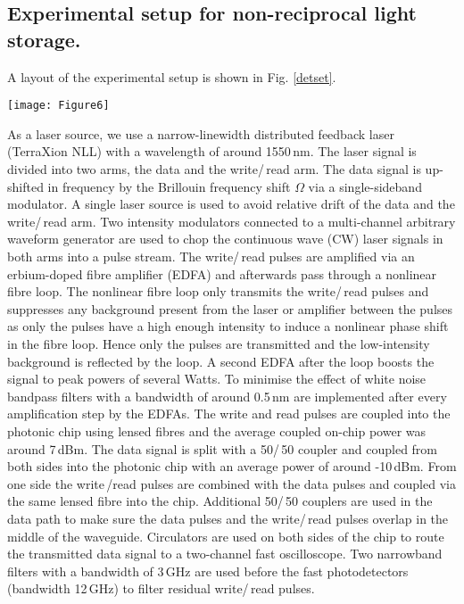 \documentclass[superscriptaddress, nofootinbib, twocolumn, amsmath,amssymb, aps, pra, notitlepage, longbibliography]{revtex4-1}
\begin{document}
\subsection{Experimental setup for non-reciprocal light storage.}
A layout of the experimental setup is shown in Fig. \ref{detset}. 
%
\begin{figure*}[t]
\begin{center}
  \texttt{[image: Figure6]}
  \caption{Experimental setup. CW laser: continuous-wave laser; 50/50: 50/50 optical fiber coupler; PC: polarisation controller; SSB: single-sideband modulator; EDFA: Erbium-doped fiber amplifier; LN-EDFA: Low-noise EDFA; IM: intensity modulator; BP: bandpass filter; AWG: arbitrary waveform generator; CH 1/\,2: Channel 1/\,2; SMF: standard single-mode fiber; PM: power meter; PD: photodetector.}
\label{detset}
\end{center}
\end{figure*}
%
As a laser source, we use a narrow-linewidth distributed feedback laser (TerraXion NLL) with a wavelength of around 1550\,nm. The laser signal is divided into two arms, the data and the write/\,read arm. The data signal is up-shifted in frequency by the Brillouin frequency shift \(\Omega\) via a single-sideband modulator. A single laser source is used to avoid relative drift of the data and the write/\,read arm. Two intensity modulators connected to a multi-channel arbitrary waveform generator are used to chop the continuous wave (CW) laser signals in both arms into a pulse stream. The write/\,read pulses are amplified via an erbium-doped fibre amplifier (EDFA) and afterwards pass through a nonlinear fibre loop. The nonlinear fibre loop only transmits the write/\,read pulses and suppresses any background present from the laser or amplifier between the pulses as only the pulses have a high enough intensity to induce a nonlinear phase shift in the fibre loop. Hence only the pulses are transmitted and the low-intensity background is reflected by the loop. A second EDFA after the loop boosts the signal to peak powers of several Watts. To minimise the effect of white noise bandpass filters with a bandwidth of around 0.5\,nm are implemented after every amplification step by the EDFAs. The write and read pulses are coupled into the photonic chip using lensed fibres and the average coupled on-chip power was around 7\,dBm. \newline
The data signal is split with a 50/\,50 coupler and coupled from both sides into the photonic chip with an average power of around -10\,dBm. From one side the write\,/read pulses are combined with the data pulses and coupled via the same lensed fibre into the chip. Additional 50/\,50 couplers are used in the data path to make sure the data pulses and the write/\,read pulses overlap in the middle of the waveguide. Circulators are used on both sides of the chip to route the transmitted data signal to a two-channel fast oscilloscope. Two narrowband filters with a bandwidth of 3\,GHz are used before the fast photodetectors (bandwidth 12\,GHz) to filter residual write/\,read pulses.\newline
%
\end{document}
